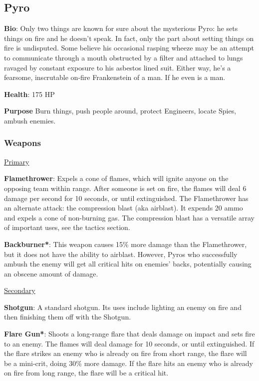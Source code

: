 \subsection{Pyro}
{\bf Bio}:
Only two things are known for sure about the mysterious Pyro: he sets things on fire and he doesn't speak. In fact, only the part about setting things on fire is undisputed. Some believe his occasional rasping wheeze may be an attempt to communicate through a mouth obstructed by a filter and attached to lungs ravaged by constant exposure to his asbestos lined suit. Either way, he's a fearsome, inscrutable on-fire Frankenstein of a man. If he even is a man.

{\bf Health}: 175 HP

{\bf Purpose}
Burn things, push people around, protect Engineers, locate Spies, ambush enemies.

\subsubsection {Weapons}

\begin {center}
\underline {Primary}
\end {center}

{\bf Flamethrower}: Expels a cone of flames, which will ignite anyone on the opposing team within range. After someone is set on fire, the flames will deal 6 damage per second for 10 seconds, or until extinguished. The Flamethrower has an alternate attack: the compression blast (aka airblast). It expends 20 ammo and expels a cone of non-burning gas. The compression blast has a versatile array of important uses, see the tactics section.

{\bf Backburner*}: This weapon causes 15\% more damage than the Flamethrower, but it does not have the ability to airblast. However, Pyros who successfully ambush the enemy will get all critical hits on enemies' backs, potentially causing an obscene amount of damage. 


\begin {center}
\underline {Secondary}
\end {center}

{\bf Shotgun}: A standard shotgun. Its uses include lighting an enemy on fire and then finishing them off with the Shotgun.

{\bf Flare Gun*}: Shoots a long-range flare that deals damage on impact and sets fire to an enemy. The flames will deal damage for 10 seconds, or until extinguished. If the flare strikes an enemy who is already on fire from short range, the flare will be a mini-crit, doing 30\% more damage. If the flare hits an enemy who is already on fire from long range, the flare will be a critical hit.

